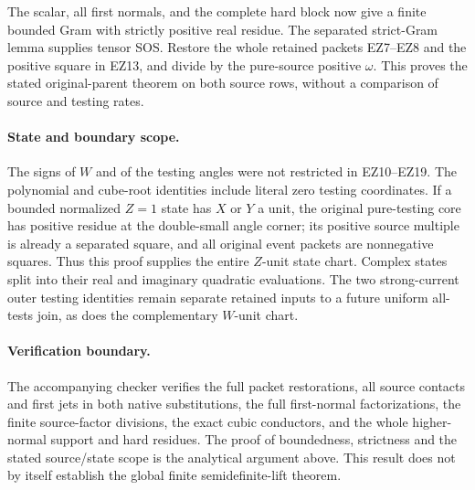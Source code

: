 The scalar, all first normals, and the complete hard block now
give a finite bounded Gram with strictly positive real residue.
The separated strict-Gram lemma supplies tensor SOS.
Restore the whole retained packets EZ7--EZ8 and the positive
square in EZ13, and divide by the pure-source positive $\omega$.
This proves the stated original-parent theorem on both source
rows, without a comparison of source and testing rates.

\paragraph{State and boundary scope.}
The signs of $W$ and of the testing angles were not restricted
in EZ10--EZ19. The polynomial and cube-root identities include
literal zero testing coordinates. If a bounded normalized
$Z=1$ state has $X$ or $Y$ a unit, the original pure-testing
core has positive residue at the double-small angle corner;
its positive source multiple is already a separated square,
and all original event packets are nonnegative squares.
Thus this proof supplies the entire $Z$-unit state chart.
Complex states split into their real and imaginary quadratic
evaluations. The two strong-current outer testing identities
remain separate retained inputs to a future uniform all-tests
join, as does the complementary $W$-unit chart.

\paragraph{Verification boundary.}
The accompanying checker verifies the full packet restorations,
all source contacts and first jets in both native substitutions,
the full first-normal factorizations, the finite source-factor
divisions, the exact cubic conductors, and the whole higher-normal
support and hard residues. The proof of boundedness, strictness
and the stated source/state scope is the analytical argument
above. This result does not by itself establish the global
finite semidefinite-lift theorem.
